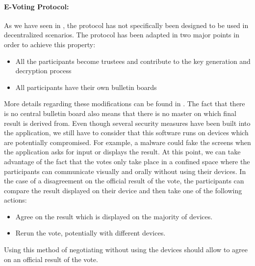 \documentclass[numbers=noenddot, abstract=on, a4paper, headsepline,
footsepline, oneside, draft=off]{scrreprt}
\begin{document}
\paragraph{E-Voting Protocol:} As we have seen in , the protocol
has not specifically been designed to be used in decentralized scenarios. The
protocol has been adapted in two major points in order to achieve this property:
\begin{itemize}
  \item All the participants become trustees and contribute to the key
  generation and decryption process
  \item All participants have their own bulletin boards
\end{itemize}
More details regarding these modifications can be found in
. The fact that there is no central bulletin board also
means that there is no master on which final result is derived from. Even though
several security measures have been built into the application, we still have to
consider that this software runs on devices which are potentially compromised.
For example, a malware could fake the screens when the application asks for
input or displays the result.
At this point, we can take advantage of the fact that the votes only take place
in a confined space where the participants can communicate visually and orally
without using their devices. In the case of a disagreement on the official
result of the vote, the participants can compare the result displayed on their
device and then take one of the following actions:
\begin{itemize}
  \item Agree on the result which is displayed on the majority of devices.
  \item Rerun the vote, potentially with different devices.
\end{itemize}
Using this method of negotiating without using the devices should allow to agree
on an official result of the vote.
\end{document}

